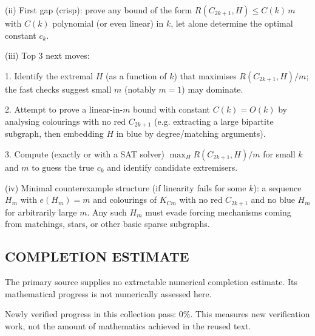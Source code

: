 (ii) First gap (crisp): prove any bound of the form $R(C_{2k+1},H)\le C(k)\,m$ with $C(k)$ 
polynomial (or even linear) in $k$, let alone determine the optimal constant $c_k$.

(iii) Top 3 next moves:

1. Identify the extremal $H$ (as a function of $k$) that maximises $R(C_{2k+1},H)/m$; the fast checks suggest small $m$ (notably $m=1$) may dominate.

2. Attempt to prove a linear-in-$m$ bound with constant $C(k)=O(k)$ by analysing colourings with no red $C_{2k+1}$ (e.g. extracting a large bipartite subgraph, then embedding $H$ in blue by degree/matching arguments).

3. Compute (exactly or with a SAT solver) $\max_H R(C_{2k+1},H)/m$ for small $k$ and $m$ to guess the true $c_k$ and identify candidate extremisers.

(iv) Minimal counterexample structure (if linearity fails for some $k$): a sequence $H_m$ with $e(H_m)=m$ and colourings of $K_{C m}$ with no red $C_{2k+1}$ and no blue $H_m$ for arbitrarily large $m$. Any such $H_m$ must evade forcing mechanisms coming from matchings, stars, or other basic sparse subgraphs.




\subsection*{COMPLETION ESTIMATE}
The primary source supplies no extractable numerical completion estimate. Its mathematical progress is not numerically assessed here.

Newly verified progress in this collection pass: $0\%$. This measures new verification work, not the amount of mathematics achieved in the reused text.
